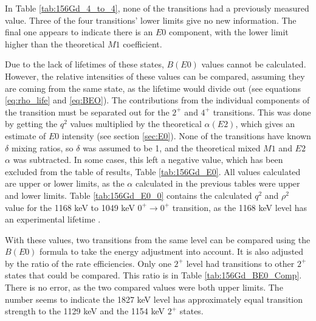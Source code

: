 \afterpage{\clearpage}
   
In Table \ref{tab:156Gd_4_to_4}, none of the transitions had a previously measured value. Three of the four transitions' lower limits give no new information. The final one appears to indicate there is an $E0$ component, with the lower limit higher than the theoretical $M1$ coefficient. 



Due to the lack of lifetimes of these states, $B(E0)$ values cannot be calculated. However, the relative intensities of these values can be compared, assuming they are coming from the same state, as the lifetime would divide out (see equations \ref{eq:rho_life} and \ref{eq:BEO}). The contributions from the individual components of the transition must be separated out for the $2^+$ and $4^+$ transitions. This was done by getting the $q^2$ values multiplied by the theoretical $\alpha(E2)$, which gives an estimate of $E0$ intensity (see section \ref{sec:E0}). None of the transitions have known $\delta$ mixing ratios, so $\delta$ was assumed to be 1, and the theoretical mixed $M1$ and $E2$ $\alpha$ was subtracted. In some cases, this left a negative value, which has been excluded from the table of results, Table \ref{tab:156Gd_E0}. All values calculated are upper or lower limits, as the $\alpha$ calculated in the previous tables were upper and lower limits. Table \ref{tab:156Gd_E0_0} contains the calculated $q^2$ and $\rho^2$ value for the 1168 keV to 1049 keV $0^+\rightarrow0^+$ transition, as the 1168 keV level has an experimental lifetime \citep{aprahamian18:_156gd}.

With these values, two transitions from the same level can be compared using the $B(E0)$ formula to take the energy adjustment into account. It is also adjusted by the ratio of the rate efficiencies. Only one $2^+$ level had transitions to other $2^+$ states that could be compared. This ratio is in Table \ref{tab:156Gd_BE0_Comp}. There is no error, as the two compared values were both upper limits. The number seems to indicate the 1827 keV level has approximately equal transition strength to the 1129 keV and the 1154 keV $2^+$ states.

\afterpage{}

\afterpage{}